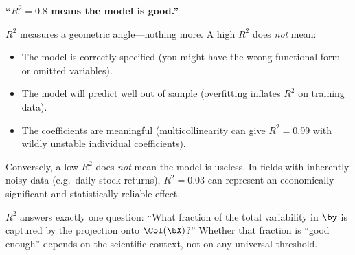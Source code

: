 
\begin{misconception}
\textbf{``$R^2 = 0.8$ means the model is good.''}

$R^2$ measures a geometric angle---nothing more.
A high $R^2$ does \emph{not} mean:
\begin{itemize}[nosep]
  \item The model is correctly specified (you might have the wrong
        functional form or omitted variables).
  \item The model will predict well out of sample (overfitting
        inflates $R^2$ on training data).
  \item The coefficients are meaningful (multicollinearity can give
        $R^2 = 0.99$ with wildly unstable individual coefficients).
\end{itemize}
Conversely, a low $R^2$ does \emph{not} mean the model is useless.
In fields with inherently noisy data (e.g.\ daily stock returns),
$R^2 = 0.03$ can represent an economically significant and
statistically reliable effect.

$R^2$ answers exactly one question: ``What fraction of the total
variability in $\by$ is captured by the projection onto $\Col(\bX)$?''
Whether that fraction is ``good enough'' depends on the scientific
context, not on any universal threshold.
\end{misconception}



